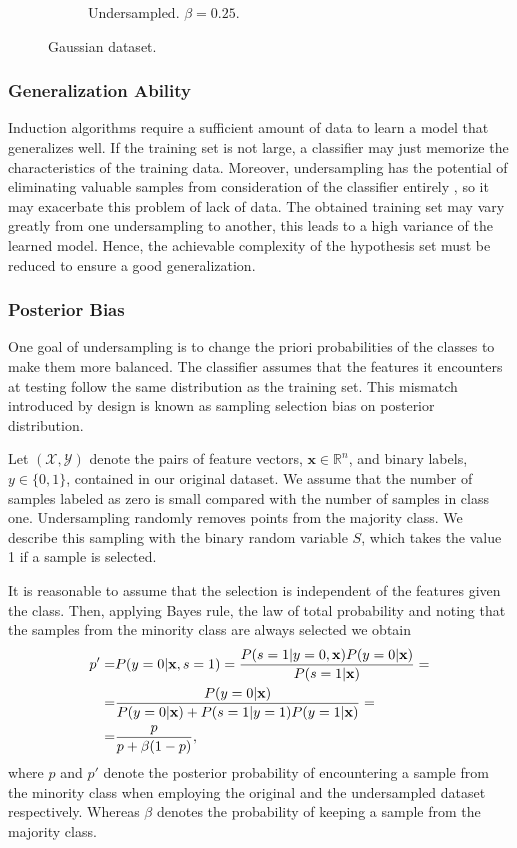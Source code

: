 \documentclass[conference]{IEEEtran}
\begin{document}
\begin{figure}[h]
\begin{subfigure}[b]{0.24\textwidth}
			         \caption{Undersampled. $\beta=0.25$.}
			         \label{fig:Undersampling_2D_UndersampledDataset}
			     \end{subfigure}
			        \caption{Gaussian dataset.}
			        \label{fig:Undersampling_2D_OriginalHistograms}
			\end{figure}

	\subsubsection{Generalization Ability}
		Induction algorithms require a sufficient amount of data to learn a model that generalizes well.  If the training set is not large, a classifier may just memorize the characteristics of the training data. Moreover, undersampling has the potential of eliminating valuable samples from consideration of the classifier entirely \cite{undersampling_generalization}, so it may exacerbate this problem of lack of data. The obtained training set may vary greatly from one undersampling to another, this leads to a high variance of the learned model. Hence, the achievable complexity of the hypothesis set must be reduced to ensure a good generalization.
		
	\subsubsection{Posterior Bias}
		One goal of undersampling is to change the priori probabilities of the classes to make them more balanced. The classifier assumes that the features it encounters at testing follow the same distribution as the training set. This mismatch introduced by design is known as sampling selection bias \cite{sampling_bias} on posterior distribution.

		Let $(\mathcal{X}, \mathcal{Y})$ denote the pairs of feature vectors, $\mathbf{x} \in \mathbb{R}^n$,  and binary labels, $y \in \{0, 1\}$, contained in our original dataset. We assume that the number of samples labeled as zero is small compared with the number of samples in class one. Undersampling randomly removes points from the majority class. We describe this sampling with the binary random variable $S$, which takes the value 1 if a sample is selected.

		It is reasonable to assume that the selection is independent of the features given the class. Then, applying Bayes rule, the law of total probability and noting that the samples from the minority class are always selected we obtain
		\begin{align*} \label{posterior}
			p' = & P(y=0|\mathbf{x}, s=1)=  \frac{P(s=1|y=0, \mathbf{x})P(y=0|\mathbf{x})}{P(s=1|\mathbf{x})}=\notag\\
					=&  \frac{P(y=0|\mathbf{x})}{P(y=0|\mathbf{x})+P(s=1|y=1)P(y=1|\mathbf{x})}=\notag\\
=&\frac{p}{p+\beta(1-p)},
		\end{align*}
where $p$ and $p'$ denote the posterior probability of encountering a sample from the minority class when employing the original and the undersampled dataset respectively. Whereas $\beta$ denotes the probability of keeping a sample from the majority class.
\end{document}
